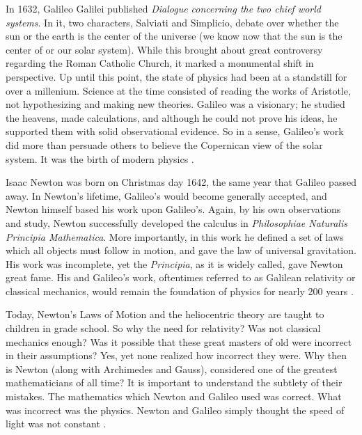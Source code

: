 \documentclass[12pt]{article}
\theoremstyle{defn}
\theoremstyle{pf}
\newcommand{\0}{\emptyset}
\renewcommand{\-}{\setminus}
\begin{document}
In 1632, Galileo Galilei published \textit{Dialogue concerning the two chief
world systems}. In it, two characters, Salviati and Simplicio, debate over whether the sun or the earth is the center of the universe (we know now
that the sun is the center of or our solar system). While this brought
about great controversy regarding the Roman Catholic Church, it marked a monumental shift in perspective. Up until this
point, the state of physics had been at a standstill for over a
millenium. Science at the time consisted of reading the works of Aristotle, not hypothesizing and making new theories. Galileo was a visionary; he studied the heavens, made calculations, and although he could not prove his ideas, he supported them with solid observational evidence. So in a sense, Galileo's work did
more than persuade others to believe the Copernican view of the
solar system. It was the birth of modern physics \cite{blackwell}. 


Isaac Newton was born on Christmas day 1642, the same year that Galileo
passed away. In Newton's lifetime, Galileo's would become generally accepted, and Newton himself based his work upon Galileo's. Again, by his own observations and study, Newton successfully developed the calculus in \textit{Philosophiae Naturalis Principia Mathematica}. More importantly, in this work he defined a set of laws which all objects must follow in motion, and gave the law of universal gravitation. His work was incomplete, yet the \textit{Principia}, as it is widely called, gave Newton great fame. His and Galileo's work, oftentimes referred to as Galilean relativity or classical mechanics, would remain the foundation of physics for nearly 200 years \cite{blackwell}. 

Today, Newton's Laws of Motion and the heliocentric theory are taught to children in grade school. So why the need for relativity? Was not classical mechanics enough? Was it possible that these great masters of old were incorrect in their assumptions? Yes, yet none realized how incorrect they were. Why then is Newton (along with Archimedes and Gauss), considered one of the greatest mathematicians of all time? It is important to understand the subtlety of their mistakes. The mathematics which Newton and Galileo used was correct. What was incorrect was the physics. Newton and Galileo simply thought the speed of light was not constant \cite{bell}. 
\end{document}
